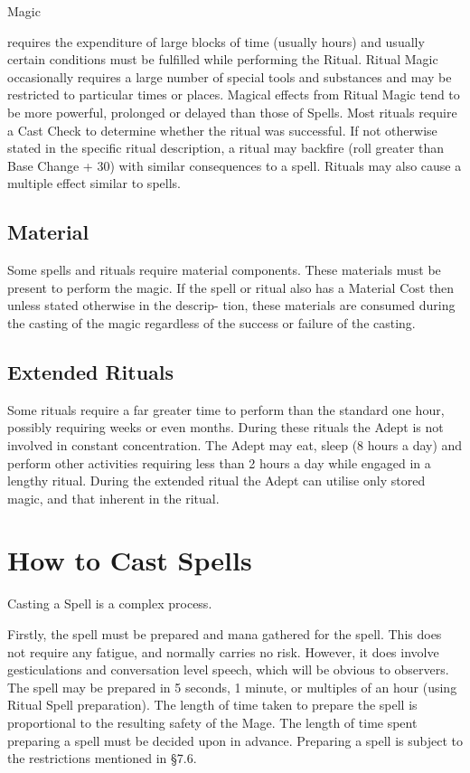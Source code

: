 \begin{Chapter}{Magic}
\begin{Description}
\item[Ritual Magic] requires the expenditure of large blocks of time
  (usually hours) and usually certain conditions must be fulfilled
  while performing the Ritual.  Ritual Magic occasionally requires a
  large number of special tools and substances and may be restricted
  to particular times or places.  Magical effects from Ritual Magic
  tend to be more powerful, prolonged or delayed than those of Spells.
  Most rituals require a Cast Check to determine whether the ritual
  was successful.  If not otherwise stated in the specific ritual
  description, a ritual may backfire (roll greater than Base Change +
  30) with similar consequences to a spell.  Rituals may also cause a
  multiple effect similar to spells.

\end{Description}

\subsection{Material}

Some spells and rituals require material components.  These materials
must be present to perform the magic.  If the spell or ritual also has
a Material Cost then unless stated otherwise in the descrip- tion,
these materials are consumed during the casting of the magic
regardless of the success or failure of the casting.


\subsection{Extended Rituals}

Some rituals require a far greater time to perform than the standard
one hour, possibly requiring weeks or even months.  During these
rituals the Adept is not involved in constant concentration.  The
Adept may eat, sleep (8 hours a day) and perform other activities
requiring less than 2 hours a day while engaged in a lengthy ritual.
During the extended ritual the Adept can utilise only stored magic,
and that inherent in the ritual.

\section{How to Cast Spells}

Casting a Spell is a complex process. 

\begin{Description}
  \item[Preparing] Firstly, the spell must be prepared and mana
    gathered for the spell.  This does not require any fatigue, and
    normally carries no risk. However, it does involve gesticulations
    and conversation level speech, which will be obvious to observers.
    The spell may be prepared in 5 seconds, 1 minute, or multiples of
    an hour (using Ritual Spell preparation). The length of time taken
    to prepare the spell is proportional to the resulting safety of
    the Mage.  The length of time spent preparing a spell must be
    decided upon in advance.  Preparing a spell is subject to the
    restrictions mentioned in §7.6.


\end{Description}
\end{Chapter}
